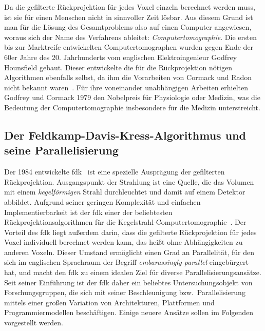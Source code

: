 Da die gefilterte Rückprojektion für jedes Voxel einzeln berechnet werden muss, ist sie für einen Menschen nicht in
sinnvoller Zeit lösbar. Aus diesem Grund ist man für die Lösung des Gesamtproblems also auf einen Computer angewiesen,
woraus sich der Name des Verfahrens ableitet: \textit{Computertomographie}. Die ersten bis zur Marktreife entwickelten
Computertomographen wurden gegen Ende der 60er Jahre des 20. Jahrhunderts vom englischen Elektroingenieur Godfrey
Hounsfield gebaut. Dieser entwickelte die für die Rückprojektion nötigen Algorithmen ebenfalls selbst, da ihm die
Vorarbeiten von Cormack und Radon nicht bekannt waren~\cite{kalender}. Für ihre voneinander unabhängigen Arbeiten
erhielten Godfrey und Cormack 1979 den Nobelpreis für Physiologie oder Medizin, was die Bedeutung der
Computertomographie insbesondere für die Medizin unterstreicht.

\subsection{Der Feldkamp-Davis-Kress-Algorithmus und seine Parallelisierung}

Der 1984 entwickelte \gls{fdk}~\cite{fdk} ist eine spezielle Ausprägung der gefilterten Rückprojektion. Ausgangspunkt
der Strahlung ist eine Quelle, die das Volumen mit einem \textit{kegelförmigen} Strahl durchleuchtet und damit auf einem
Detektor abbildet. Aufgrund seiner geringen Komplexität und einfachen Implementierbarkeit ist der \gls{fdk} einer der 
beliebtesten Rückprojektionsalgorithmen für die Kegelstrahl-Computertomographie~\cite{xumuell}. Der Vorteil des
\gls{fdk} liegt außerdem darin, dass die gefilterte Rückprojektion für jedes Voxel individuell berechnet werden kann,
das heißt ohne Abhängigkeiten zu anderen Voxeln. Dieser Umstand ermöglicht einen Grad an Parallelität, für den sich im
englischen Sprachraum der Begriff \textit{embarassingly parallel} eingebürgert hat, und macht den \gls{fdk} zu einem
idealen Ziel für diverse Parallelisierungsansätze. Seit seiner Einführung ist der \gls{fdk} daher ein beliebtes
Untersuchungsobjekt von Forschungsgruppen, die sich mit seiner Beschleunigung bzw.\ Parallelisierung mittels einer
großen Variation von Architekturen, Plattformen und Programmiermodellen beschäftigen. Einige neuere Ansätze sollen im
Folgenden vorgestellt werden.

